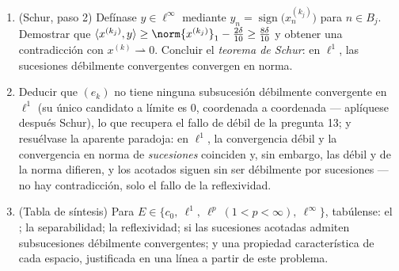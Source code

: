 \begin{problem}[{Problema de fin de semana --- $(\ell^p)' = \ell^q$,
reflexividad y la rareza de $\ell^\infty$}]
\begin{enumerate}[resume]
  $k_1 < k_2 < \cdots$ y enteros $0 = N_0 < N_1 < N_2 < \cdots$ tales
  que la masa de $x^{(k_j)}$ se concentre en el bloque $B_j =
        \intoc{N_{j-1}}{N_j}$:
        \[
        \sum_{n \in B_j}\bigl|x^{(k_j)}_n\bigr| \geq
        \norm{x^{(k_j)}}_1 - \frac\delta{10} .
        \]
  \item (Schur, paso 2) Defínase $y \in \ell^\infty$ mediante $y_n =
        \operatorname{sign}\bigl(x^{(k_j)}_n\bigr)$ para $n \in
        B_j$. Demostrar que $\langle x^{(k_j)}, y\rangle \geq
        \norm{x^{(k_j)}}_1 - \frac{2\delta}{10} \geq
        \frac{8\delta}{10}$ y obtener una contradicción con
  $x^{(k)} \rightharpoonup 0$. Concluir el \emph{teorema de Schur}: en
  $\ell^1$, las sucesiones débilmente convergentes convergen en norma.
  \item Deducir que $(e_k)$ no tiene ninguna subsucesión débilmente
  convergente en $\ell^1$ (su único candidato a límite es $0$,
  coordenada a coordenada --- aplíquese después Schur), lo que recupera
  el fallo de  débil de la pregunta 13; y resuélvase la
  aparente paradoja: en $\ell^1$, la convergencia débil y la
  convergencia en norma de \emph{sucesiones} coinciden y, sin embargo,
  las \emph{} débil y de la norma difieren, y los acotados
  siguen sin ser débilmente 
  por sucesiones --- no hay contradicción, solo el fallo de la
  reflexividad. \item (Tabla de síntesis) Para
  $E \in \{c_0,\ \ell^1,\ \ell^p\
        (1{<}p{<}\infty),\ \ell^\infty\}$, tabúlense: el
  ; la separabilidad; la
  reflexividad; si las sucesiones acotadas admiten subsucesiones
  débilmente convergentes; y una propiedad característica de cada
  espacio, justificada en una línea a partir de este problema.
\end{enumerate}


\end{problem}
